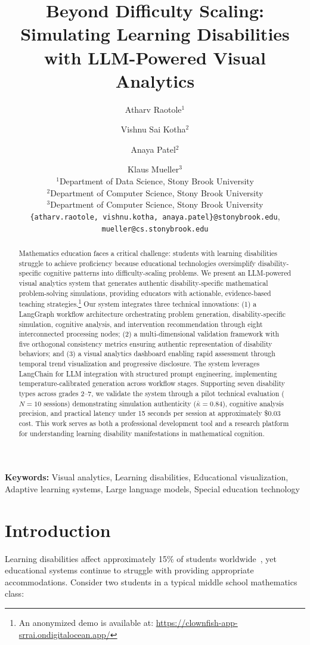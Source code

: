 \documentclass[11pt]{article}
\title{Beyond Difficulty Scaling: Simulating Learning Disabilities with LLM-Powered Visual Analytics}
\author{
Atharv Raotole$^{1}$ \and Vishnu Sai Kotha$^{2}$ \and Anaya Patel$^{2}$ \and Klaus Mueller$^{3}$ \\
$^{1}$Department of Data Science, Stony Brook University \\
$^{2}$Department of Computer Science, Stony Brook University \\
$^{3}$Department of Computer Science, Stony Brook University \\
\texttt{\{atharv.raotole, vishnu.kotha, anaya.patel\}@stonybrook.edu}, \texttt{mueller@cs.stonybrook.edu}
}
\date{}
\begin{document}
\maketitle

\begin{abstract}
\noindent
Mathematics education faces a critical challenge: students with learning disabilities struggle to achieve proficiency because educational technologies oversimplify disability-specific cognitive patterns into difficulty-scaling problems. We present an LLM-powered visual analytics system that generates authentic disability-specific mathematical problem-solving simulations, providing educators with actionable, evidence-based teaching strategies.\footnote{An anonymized demo is available at: \url{https://clownfish-app-srrai.ondigitalocean.app/}} Our system integrates three technical innovations: (1) a LangGraph workflow architecture orchestrating problem generation, disability-specific simulation, cognitive analysis, and intervention recommendation through eight interconnected processing nodes; (2) a multi-dimensional validation framework with five orthogonal consistency metrics ensuring authentic representation of disability behaviors; and (3) a visual analytics dashboard enabling rapid assessment through temporal trend visualization and progressive disclosure. The system leverages LangChain for LLM integration with structured prompt engineering, implementing temperature-calibrated generation across workflow stages. Supporting seven disability types across grades 2--7, we validate the system through a pilot technical evaluation ($N=10$ sessions) demonstrating simulation authenticity ($\bar{\kappa}=0.84$), cognitive analysis precision, and practical latency under 15 seconds per session at approximately \$0.03 cost. This work serves as both a professional development tool and a research platform for understanding learning disability manifestations in mathematical cognition.
\end{abstract}

\textbf{Keywords:} Visual analytics, Learning disabilities, Educational visualization, Adaptive learning systems, Large language models, Special education technology

\section{Introduction}\label{sec:intro}

Learning disabilities affect approximately 15\% of students worldwide~\cite{ref1}, yet educational systems continue to struggle with providing appropriate accommodations. Consider two students in a typical middle school mathematics class:
\end{document}
